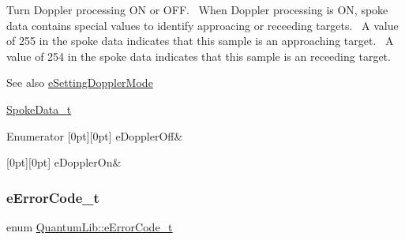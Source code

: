 Turn Doppler processing ON or O\+FF.~\newline
When Doppler processing is ON, spoke data contains special values to identify approacing or receeding targets.~\newline
A value of 255 in the spoke data indicates that this sample is an approaching target.~\newline
A value of 254 in the spoke data indicates that this sample is an receeding target. \begin{DoxySeeAlso}{See also}
\mbox{\hyperlink{namespace_quantum_lib_acc8124e3e65bca4aa798d03a55e3d54ca10e888ffc18101208220d6445208cd6d}{e\+Setting\+Doppler\+Mode}} 

\mbox{\hyperlink{struct_quantum_lib_1_1_spoke_data__t}{Spoke\+Data\+\_\+t}} 
\end{DoxySeeAlso}
\begin{DoxyEnumFields}{Enumerator}
[0pt][0pt]{}\mbox{\label{namespace_quantum_lib_a67a865bb9894671b27595a61dfcd44b5a1405e885752fc9e27e222762e559a414}} 
e\+Doppler\+Off&\\
\hline

[0pt][0pt]{}\mbox{\label{namespace_quantum_lib_a67a865bb9894671b27595a61dfcd44b5a0d269d3a17442468bad3da1aa57319da}} 
e\+Doppler\+On&\\
\hline

\end{DoxyEnumFields}
\mbox{\label{namespace_quantum_lib_ae3625bf7f9a1ca0d93adb9a2e0194d47}} 
\subsubsection{\texorpdfstring{e\+Error\+Code\+\_\+t}{eErrorCode\_t}}
{\footnotesize\ttfamily enum \mbox{\hyperlink{namespace_quantum_lib_ae3625bf7f9a1ca0d93adb9a2e0194d47}{Quantum\+Lib\+::e\+Error\+Code\+\_\+t}}}

